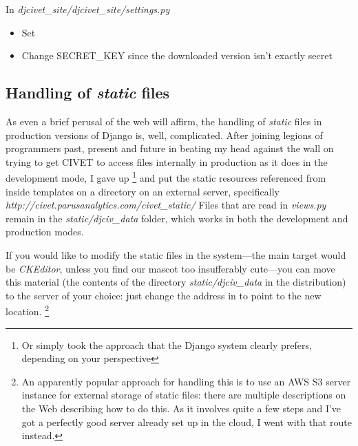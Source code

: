 \documentclass[letterpaper,10pt,english]{sphinxmanual}
\begin{document}
In \emph{djcivet\_site/djcivet\_site/settings.py}
\begin{itemize}
\item {} 
Set 

\item {} 
Change SECRET\_KEY since the downloaded version isn't exactly secret

\end{itemize}


\subsection{Handling of \emph{static} files}
\label{appendix4:handling-of-static-files}
As even a brief perusal of the web will affirm, the handling of \emph{static} files in production versions of
Django is, well, complicated. After joining legions of programmers past, present and future in beating my head against
the wall on trying to get CIVET to access files internally in production as it does in the development mode, I gave up \footnote{
Or simply took the approach that the Django system clearly prefers, depending on your perspective
}
and put the static resources referenced from inside templates on a directory on an external server, specifically
\emph{http://civet.parusanalytics.com/civet\_static/}  Files that are read in \emph{views.py} remain in the \emph{static/djciv\_data}
folder, which works in both the development and production modes.

If you would like to modify the static files in the system—the main target would be \emph{CKEditor}, unless you find our
mascot too insufferably cute—you can move this material (the contents of the directory \emph{static/djciv\_data} in the distribution) to
the server of your choice: just change the address in  to point to the new location. \footnote{
An apparently popular approach for handling this is to use an AWS S3 server instance for external storage of static files:
there are multiple descriptions on the Web describing how to do this. As it involves quite a few steps and I've
got a perfectly good server already set up in the cloud, I went with that route instead.
}
\end{document}
